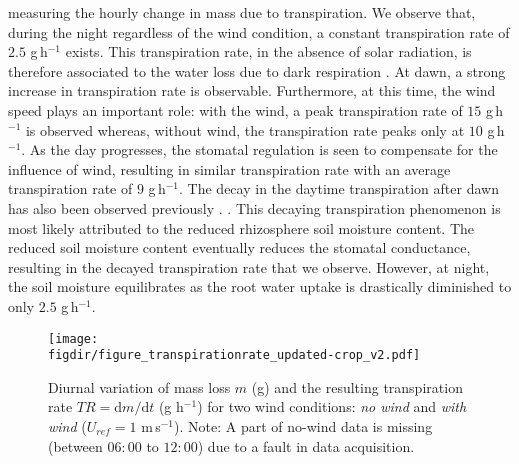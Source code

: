 measuring the hourly change in mass due to transpiration. We observe that, during the night regardless of the wind condition, a constant transpiration rate of $2.5$ g\,h$^{-1}$ exists. This transpiration rate, in the absence of solar radiation, is therefore associated to the water loss due to dark respiration \citep{Farquhar1980, Lambers2008, Launiainen2015}. At dawn, a strong increase in transpiration rate is observable. Furthermore, at this time, the wind speed plays an important role: with the wind, a peak transpiration rate of $15$ g\,h$^{-1}$ is observed whereas, without wind, the transpiration rate peaks only at $10$ g\,h$^{-1}$. As the day progresses, the stomatal regulation is seen to compensate for the influence of wind, resulting in similar transpiration rate with an average transpiration rate of $9$ g\,h$^{-1}$. The decay in the daytime transpiration after dawn has also been observed previously \citep{Javaux2013, Tuzet2003}. . This decaying transpiration phenomenon is most likely attributed to the reduced rhizosphere soil moisture content. The reduced soil moisture content eventually reduces the stomatal conductance, resulting in the decayed transpiration rate that we observe. However, at night, the soil moisture equilibrates as the root water uptake is drastically diminished to only $2.5$ g\,h$^{-1}$.

\begin{figure}[t]
	\centering
	\texttt{[image: \\figdir/figure\_transpirationrate\_updated-crop\_v2.pdf]}
	\caption{Diurnal variation of mass loss $m$ (g) and the resulting transpiration rate $TR=\mathrm{d}m/\mathrm{d}t$ (g h$^{-1}$) for two wind conditions: \textit{no wind} and \textit{with wind} ($U_{ref}=1$ m\,s$^{-1}$). Note: A part of no-wind data is missing (between $06:00$ to $12:00$) due to a fault in data acquisition.}
	\label{fig:figure_transpirationrate}
\end{figure}

